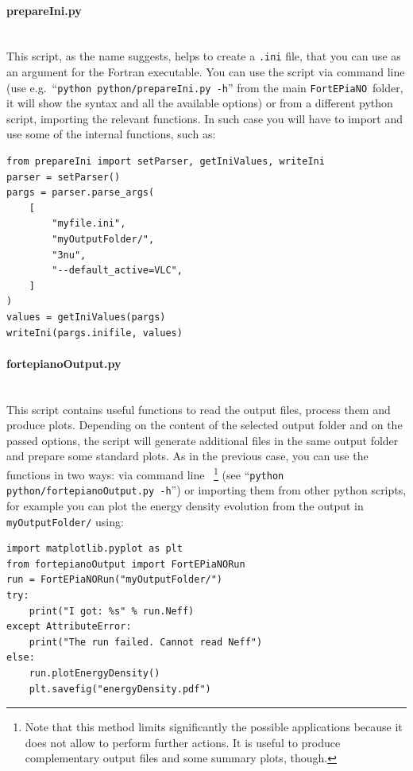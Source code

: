 \documentclass[notitlepage,nofootinbib,showpacs,preprintnumbers,amsmath,amssymb,superscriptaddress,prd,onecolumn]{revtex4-1}
\newcommand{\fortepiano}{\texttt{FortEPiaNO}}
\begin{document}
\smallskip
\paragraph{prepareIni.py}~\\
This script, as the name suggests, helps to create a \texttt{.ini} file,
that you can use as an argument for the Fortran executable.
You can use the script via command line
(use e.g.~``\texttt{python python/prepareIni.py -h}''
from the main \fortepiano\ folder, it will show the syntax and all the available options)
or from a different python script, importing the relevant functions.
In such case you will have to import and use some of the internal functions, such as:
\begin{verbatim}
from prepareIni import setParser, getIniValues, writeIni
parser = setParser()
pargs = parser.parse_args(
    [
        "myfile.ini",
        "myOutputFolder/",
        "3nu",
        "--default_active=VLC",
    ]
)
values = getIniValues(pargs)
writeIni(pargs.inifile, values)
\end{verbatim}

\smallskip
\paragraph{fortepianoOutput.py}~\\
This script contains useful functions to read the output files, process them and produce plots.
Depending on the content of the selected output folder and on the passed options,
the script will generate additional files in the same output folder
and prepare some standard plots.
As in the previous case, you can use the functions in two ways:
via command line~%
\footnote{
Note that this method limits significantly the possible applications
because it does not allow to perform further actions.
It is useful to produce complementary output files and some summary plots, though.
}
(see ``\texttt{python python/fortepianoOutput.py -h}'')
or importing them from other python scripts,
for example you can plot the energy density evolution from the output in \texttt{myOutputFolder/} using:
\begin{verbatim}
import matplotlib.pyplot as plt
from fortepianoOutput import FortEPiaNORun
run = FortEPiaNORun("myOutputFolder/")
try:
    print("I got: %s" % run.Neff)
except AttributeError:
    print("The run failed. Cannot read Neff")
else:
    run.plotEnergyDensity()
    plt.savefig("energyDensity.pdf")
\end{verbatim}
\end{document}
